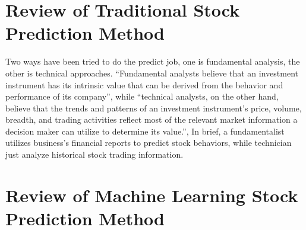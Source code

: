 \section{Review of Traditional Stock Prediction Method}

Two ways have been tried to do the predict job, one is fundamental analysis, the other is technical approaches\cite{1_edwardsmagee_1997}. “Fundamental analysts believe that an investment instrument has its intrinsic value that can be derived from the behavior and performance of its company”, while “technical analysts, on the other hand, believe that the trends and patterns of an investment instrument’s price, volume, breadth, and trading activities reflect most of the relevant market information a decision maker can utilize to determine its value.”\cite{lam2004neural}, In brief, a fundamentalist utilizes business’s financial reports to predict stock behaviors, while technician just analyze historical stock trading information.\\

\section{Review of Machine Learning Stock Prediction Method}